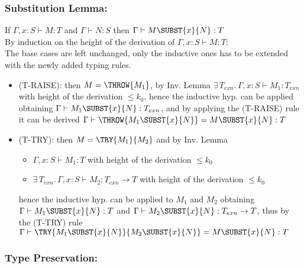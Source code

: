 \subsubsection*{Substitution Lemma:}

If $\Gamma, x: S \vdash M: T$ and $\Gamma \vdash N: S$ then $\Gamma \vdash M\SUBST{x}{N}: T$\\
By induction on the height of the derivation of $\Gamma, x: S \vdash M: T$:\\
The base cases are left unchanged, only the inductive ones has to be extended with the newly
added typing rules.
\begin{itemize}
	\item (T-RAISE): then $M = \THROW{M_1}$, by Inv. Lemma $\exists\, T_{exn}.\, \Gamma, x: S \vdash M_1: T_{exn}$ with
	      height of the derivation $\le k_0$, hence the inductive hyp. can be applied obtaining
	      $\Gamma \vdash M_1\SUBST{x}{N}: T_{exn}$, and by applying the (T-RAISE) rule it can be
	      derived $\Gamma \vdash \THROW{M_1\SUBST{x}{N}} = M\SUBST{x}{N}: T$
	\item (T-TRY): then $M = \TRY{M_1}{M_2}$ and by Inv. Lemma
	      \begin{itemize}
		      \item $\Gamma, x: S \vdash M_1: T$ with height of the derivation $\le k_0$
		      \item $\exists\, T_{exn}.\, \Gamma, x: S \vdash M_2: T_{exn} \to T$ with height of the derivation $\le k_0$
	      \end{itemize}
	      hence the inductive hyp. can be applied to $M_1$ and $M_2$ obtaining
	      $\Gamma \vdash M_1\SUBST{x}{N}: T$ and $\Gamma \vdash M_2\SUBST{x}{N}: T_{exn} \to T$,
	      thus by the (T-TRY) rule
	      $\Gamma \vdash \TRY{M_1\SUBST{x}{N}}{M_2\SUBST{x}{N}} = M\SUBST{x}{N}: T$
\end{itemize}

\subsubsection*{Type Preservation:}

